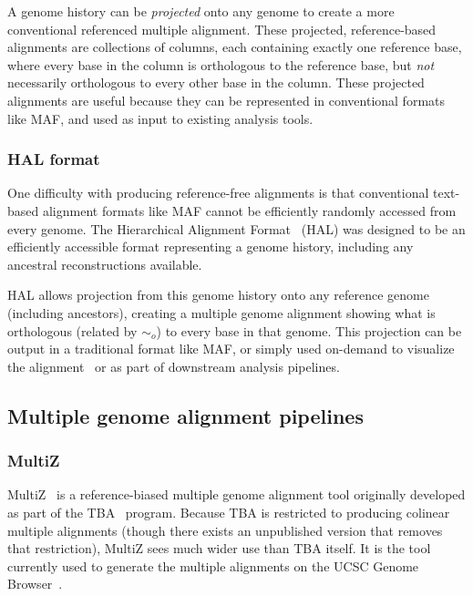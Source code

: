 \documentclass[fleqn,10pt]{wlscirep}
\begin{document}
A genome history can be \emph{projected} onto any genome to create a more conventional referenced multiple alignment.
These projected, reference-based alignments are collections of columns, each containing exactly one reference base, where every base in the column is orthologous to the reference base, but \emph{not} necessarily orthologous to every other base in the column.
These projected alignments are useful because they can be represented in conventional formats like MAF, and used as input to existing analysis tools.

\subsubsection{HAL format}
One difficulty with producing reference-free alignments is that conventional text-based alignment formats like MAF cannot be efficiently randomly accessed from every genome. The Hierarchical Alignment Format~\cite{hal} (HAL) was designed to be an efficiently accessible format representing a genome history, including any ancestral reconstructions available.

HAL allows projection from this genome history onto any reference genome (including ancestors), creating a multiple genome alignment showing what is orthologous (related by $\sim_o$) to every base in that genome. This projection can be output in a traditional format like MAF, or simply used on-demand to visualize the alignment~\cite{assemblyHub} or as part of downstream analysis pipelines.
\subsection{Multiple genome alignment pipelines}
\subsubsection{MultiZ}
MultiZ~\cite{tba} is a reference-biased multiple genome alignment tool originally developed as part of the TBA~\cite{tba} program.
Because TBA is restricted to producing colinear multiple alignments (though there exists an unpublished version that removes that restriction), MultiZ sees much wider use than TBA itself.
It is the tool currently used to generate the multiple alignments on the UCSC Genome Browser~\cite{ucscbrowser}.
\end{document}
